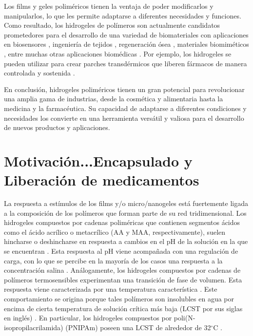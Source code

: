 Los films y geles polim\'ericos tienen la ventaja de poder modificarlos y manipularlos, lo que les permite adaptarse a diferentes necesidades y funciones.
Como resultado, los hidrogeles de pol\'imeros son actualmente candidatos prometedores para el desarrollo de una variedad de biomateriales con aplicaciones en biosensores \cite{zhang2012ultrathin,islam2014responsive}, ingenier\'ia de tejidos \cite{matricardi2013interpenetrating,van2011biopolymer}, regeneraci\'on \'osea \cite{bai2018bioactive}, materiales biomim\'eticos \cite{green2016mimicking,wu2010multifunctional}, entre muchas otras aplicaciones biom\'edicas \cite{Daly2020}.
Por ejemplo, los hidrogeles se pueden utilizar para crear parches transd\'ermicos que liberen f\'armacos de manera controlada y sostenida \addcite.

En conclusi\'on, hidrogeles polim\'ericos tienen un gran potencial para revolucionar una amplia gama de industrias, desde la cosm\'etica y alimentaria hasta la medicina y la farmac\'eutica. Su capacidad de adaptarse a diferentes condiciones y necesidades los convierte en una herramienta vers\'atil y valiosa para el desarrollo de nuevos productos y aplicaciones.




\section{Motivaci\'on...Encapsulado y Liberaci\'on de medicamentos}

La respuesta a est\'imulos de los films y/o micro/nanogeles est\'a fuertemente ligada a la composici\'on de los pol\'imeros que forman parte de su red tridimensional.
Los hidrogeles compuestos por cadenas polim\'ericas que contienen segmentos \'acidos como el \'acido acr\'ilico o metacr\'ilico (AA y MAA, respectivamente), suelen hincharse o deshincharse en respuesta a cambios en el pH de la soluci\'on en la que se encuentran \cite{snowden1996colloidal}.
Esta respuesta al pH viene acompa\~nada con una regulaci\'on de carga, con lo que se percibe en la mayor\'ia de los casos una respuesta a la concentraci\'on salina \cite{longo2019protonation}.
An\'alogamente, los hidrogeles compuestos por cadenas de pol\'imeros termosensibles experimentan una transici\'on de fase de volumen. Esta respuesta viene caracterizada por una temperatura caracter\'istica \cite{Pelton1986,Pelton2000}.
Este comportamiento se origina porque tales pol\'imeros son insolubles en agua por encima de cierta temperatura de soluci\'on cr\'itica m\'as baja (LCST por sus siglas en ingl\'es) \cite{Kawaguchi2020}.
En particular, los hidrogeles compuestos por poli(N-isopropilacrilamida) (PNIPAm) poseen una LCST de alrededor de 32$^\circ$C \cite{Schild1992}.

